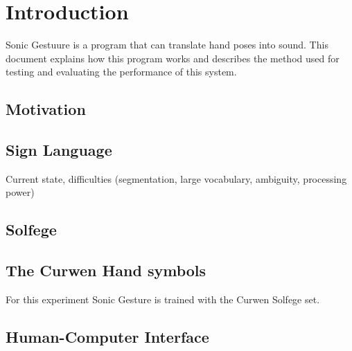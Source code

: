 \chapter{Introduction}
\label{ch:intro}

Sonic Gestuure is a program that can translate hand poses into sound. This
document explains how this program works and describes the method used for
testing and evaluating the performance of this system.

\section{Motivation}

\section{Sign Language}
Current state, difficulties (segmentation, large vocabulary, ambiguity, processing power)

\section{Solfege}


\section{The Curwen Hand symbols}
For this experiment Sonic Gesture is trained with the Curwen Solfege set\cite{choksy1999}.

\section{Human-Computer Interface}
